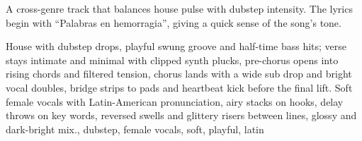 

\begin{notes}
A cross-genre track that balances house pulse with dubstep intensity. %
The lyrics begin with “Palabras en hemorragia”, giving a quick sense of the song’s tone.
\end{notes}

\begin{style}
House with dubstep drops, playful swung groove and half-time bass hits; verse stays intimate and minimal with clipped synth plucks, pre-chorus opens into rising chords and filtered tension, chorus lands with a wide sub drop and bright vocal doubles, bridge strips to pads and heartbeat kick before the final lift. %
Soft female vocals with Latin-American pronunciation, airy stacks on hooks, delay throws on key words, reversed swells and glittery risers between lines, glossy and dark-bright mix., dubstep, female vocals, soft, playful, latin
\end{style}

